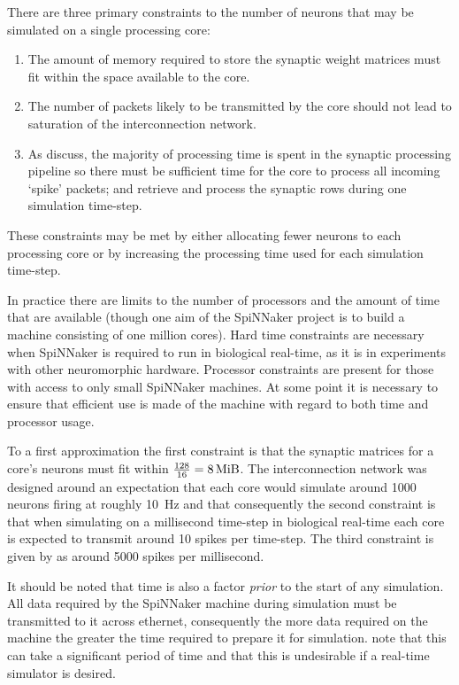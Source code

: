 \documentclass[conference]{IEEEtran}
\begin{document}
There are three primary constraints to the number of neurons that may be simulated on a single processing core:

  \begin{enumerate}
    \item The amount of memory required to store the synaptic weight matrices must fit within the space available to the core.
    \item The number of packets likely to be transmitted by the core should not lead to saturation of the interconnection network.
    \item As \textcite{Sharp2013} discuss, the majority of processing time is spent in the synaptic processing pipeline so there must be sufficient time for the core to process all incoming `spike' packets; and retrieve and process the synaptic rows during one simulation time-step.
  \end{enumerate}

These constraints may be met by either allocating fewer neurons to each processing core or by increasing the processing time used for each simulation time-step.

In practice there are limits to the number of processors and the amount of time that are available (though one aim of the SpiNNaker project is to build a machine consisting of one million cores). Hard time constraints are necessary when SpiNNaker is required to run in biological real-time, as it is in experiments with other neuromorphic hardware. Processor constraints are present for those with access to only small SpiNNaker machines. At some point it is necessary to ensure that efficient use is made of the machine with regard to both time and processor usage.

To a first approximation the first constraint is that the synaptic matrices for a core's neurons must fit within $\frac{128}{16} = \SI{8}{\mebi\byte}$. The interconnection network was designed around an expectation that each core would simulate around \num{1000} neurons firing at roughly \SI{10}{\hertz} and that consequently the second constraint is that when simulating on a millisecond time-step in biological real-time each core is expected to transmit around 10 spikes per time-step. The third constraint is given by \textcite[\S III.C]{Sharp2013} as around \num{5000} spikes per millisecond.

It should be noted that time is also a factor \textit{prior} to the start of any simulation. All data required by the SpiNNaker machine during simulation must be transmitted to it across ethernet, consequently the more data required on the machine the greater the time required to prepare it for simulation. \textcite{Sharp2013} note that this can take a significant period of time and that this is undesirable if a real-time simulator is desired.
\end{document}
